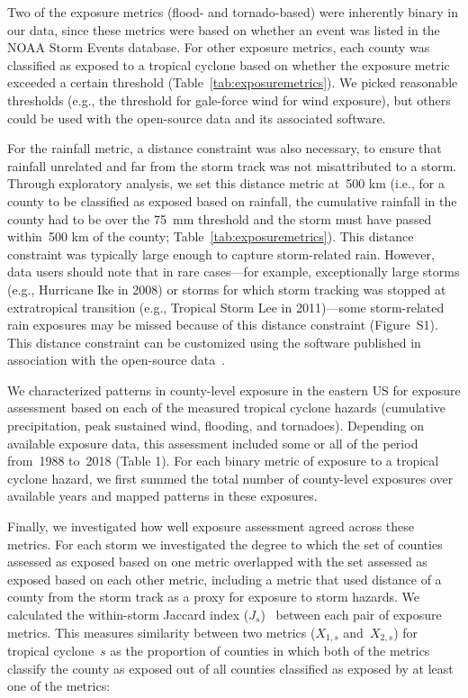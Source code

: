 Two of the exposure metrics (flood- and tornado-based) were inherently binary
in our data, since these metrics were based on whether an event was listed in
the NOAA Storm Events database.  For other exposure metrics, each county was
classified as exposed to a tropical cyclone based on whether the exposure
metric exceeded a certain threshold (Table~\ref{tab:exposuremetrics}). We
picked reasonable thresholds (e.g., the threshold for gale-force wind for 
wind exposure), but others could be used with the open-source data and its
associated software. 

For the rainfall metric, a distance constraint was also necessary, to ensure
that rainfall unrelated and far from the storm track was not misattributed to a
storm. Through exploratory analysis, we set this distance metric at~500
\si{\kilo\metre} (i.e., for a county to be classified as exposed based on
rainfall, the cumulative rainfall in the county had to be over the
75~\si{\milli\metre} threshold and the storm must have passed
within~500 \si{\kilo\metre} of the county; Table~\ref{tab:exposuremetrics}).
This distance constraint was typically large enough to capture storm-related
rain.  However, data users should note that in rare cases---for example,
exceptionally large storms (e.g., Hurricane Ike in 2008) or storms for which
storm tracking was stopped at extratropical transition (e.g., Tropical Storm
Lee in 2011)---some storm-related rain exposures may be missed because of this
distance constraint (Figure~S1). This distance constraint can be customized
using the software published in association with the open-source
data~\parencite{hurricaneexposure}.

We characterized patterns in county-level exposure in the eastern \ac{US} for
exposure assessment based on each of the measured tropical cyclone hazards
(cumulative precipitation, peak sustained wind, flooding, and tornadoes).
Depending on available exposure data, this assessment included some or all of
the period from~1988 to~2018 (Table 1). For each binary metric of exposure to a
tropical cyclone hazard, we first summed the total number of county-level
exposures over available years and mapped patterns in
these exposures. 

Finally, we investigated how well exposure assessment agreed across 
these metrics. For each storm we investigated the degree to which the 
set of counties assessed as exposed based on one metric overlapped with the set
assessed as exposed based on each other metric, including a metric that used
distance of a county from the storm track as a proxy for exposure to storm hazards. 
We calculated the within-storm
Jaccard index ($J_s$)~\parencite{jaccard1901distribution, jaccard1908nouvelles} between
each pair of exposure metrics. This measures similarity
between two metrics ($X_{1,s}$ and~$X_{2,s}$) for tropical cyclone~$s$ as the
proportion of counties in which both of the metrics classify the county as
exposed out of all counties classified as exposed by at least one of the
metrics:


